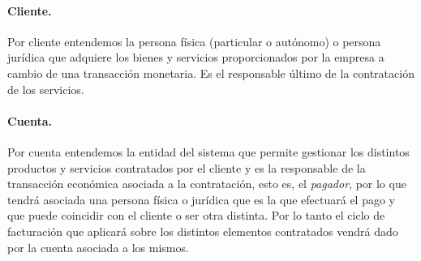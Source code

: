 \paragraph{Cliente.} Por cliente entendemos la persona física (particular o autónomo) o persona jurídica que adquiere los bienes y servicios proporcionados por la empresa a cambio de una transacción monetaria. Es el responsable último de la contratación de los servicios.

\paragraph{Cuenta.} Por cuenta entendemos la entidad del sistema que permite gestionar los distintos productos y servicios contratados por el cliente y es la responsable de la transacción económica asociada a la contratación, esto es, el \textit{pagador}, por lo que tendrá asociada una persona física o jurídica que es la que efectuará el pago y que puede coincidir con el cliente o ser otra distinta. Por lo tanto el ciclo de facturación que aplicará sobre los distintos elementos contratados vendrá dado por la cuenta asociada a los mismos.

